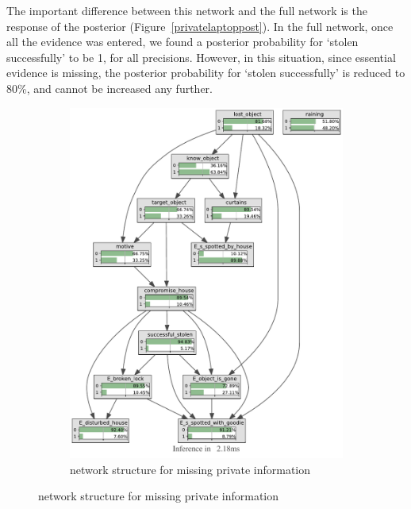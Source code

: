 The important difference between this network and the full network is the response of the posterior (Figure~\ref{privatelaptoppost}). In the full network, once all the evidence was entered, we found a posterior probability for `stolen successfully' to be 1, for all precisions. However, in this situation, since essential evidence is missing, the posterior probability for `stolen successfully' is reduced to 80\%, and cannot be increased any further. 

\begin{figure}[htbp]
\begin{center}
\begin{subfigure}{.50\textwidth}
\includegraphics[width=\linewidth]{../experiments/StolenLaptopPrivate/bnImage/BNIMAGEStolenLaptopPrivate.pdf}
\caption{network structure for missing private information}
\label{privatelaptopN}
\end{subfigure}
\end{center}


\end{figure}
